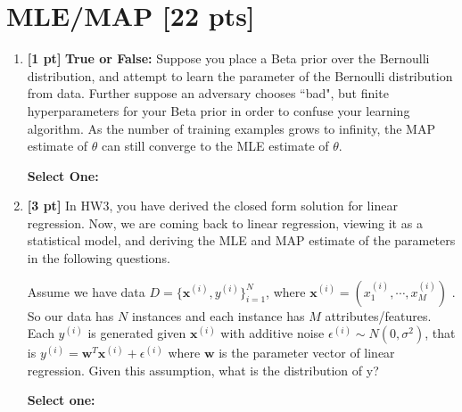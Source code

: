 \documentclass{article}
\renewcommand{\circle}{\tikz\draw[black] (0,0) circle (1ex);}
\begin{document}
\section{MLE/MAP [22 pts]}
\begin{enumerate}


    \item \textbf{[1 pt]} \textbf{True or False:} Suppose you place a Beta prior over the Bernoulli distribution, and attempt to learn the parameter of the Bernoulli distribution from data. Further suppose an adversary chooses ``bad", but finite hyperparameters for your Beta prior in order to confuse your learning algorithm. As the number of training examples grows to infinity, the MAP estimate of $\theta$ can still converge to the MLE estimate of $\theta$.
    
    \textbf{Select One:}
    
    
    \item \textbf{[3 pt]} In HW3, you have derived the closed form solution for linear regression. Now, we are coming back to linear regression, viewing it as a statistical model, and deriving the MLE and MAP estimate of the parameters in the following questions. 
    
    Assume we have data $D = \{\mathbf{x}^{(i)}, y^{(i)}\}_{i=1}^{N}$, where $\mathbf{x}^{(i)} = (x_1^{(i)}, \cdots, x_M^{(i)})$ . So our data has $N$  instances and each instance has $M$  attributes/features. Each $y^{(i)}$ is generated given $\mathbf{x}^{(i)}$ with additive noise $\epsilon^{(i)} \sim N(0, \sigma^2)$, that is $y^{(i)} = \mathbf{w}^T \mathbf{x}^{(i)} + \epsilon^{(i)}$ where $\mathbf{w}$  is the parameter vector of linear regression. Given this assumption, what is the distribution of y? 

    \textbf{Select one:}
    

\end{enumerate}
\end{document}
